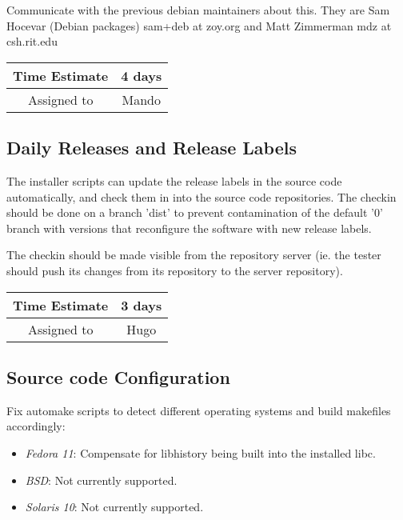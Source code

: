 \documentclass[12pt]{article}
\begin{document}
Communicate with the previous debian maintainers about this.  They are
Sam Hocevar (Debian packages) sam+deb at zoy.org and Matt Zimmerman
mdz at csh.rit.edu

\begin{center}
  \vspace{5mm}
  \centering
  \begin{tabular}{|c|c|}
    \hline
    Time Estimate
    & 4 days \\
    \hline
    Assigned to
    & Mando \\
    \hline
  \end{tabular}
\end{center}


\subsection{Daily Releases and Release Labels}

The installer scripts can update the release labels in the source code
automatically, and check them in into the source code repositories.
The checkin should be done on a branch 'dist' to prevent contamination
of the default '0' branch with versions that reconfigure the software
with new release labels.

The checkin should be made visible from the repository server (ie. the
tester should push its changes from its repository to the server
repository).

\begin{center}
  \vspace{5mm}
  \centering
  \begin{tabular}{|c|c|}
    \hline
    Time Estimate
    & 3 days \\
    \hline
    Assigned to
    & Hugo \\
    \hline
  \end{tabular}
\end{center}


\subsection{Source code Configuration}

Fix automake scripts to detect different operating systems 
and build makefiles accordingly:


\begin{itemize}
\item {\it Fedora 11}: Compensate for libhistory being built into the
  installed libc.
\item {\it BSD}: Not currently supported.
\item {\it Solaris 10}: Not currently supported.
\end{itemize}
\end{document}
